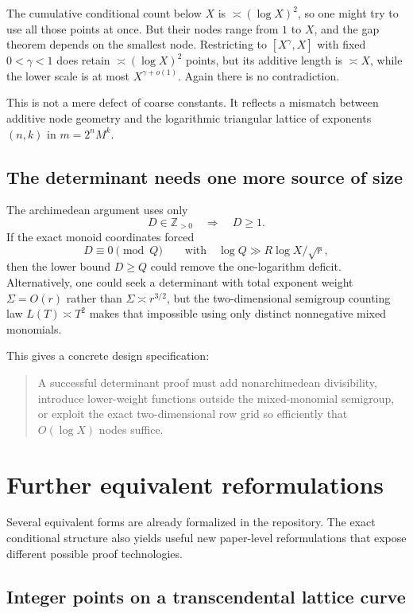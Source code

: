 \documentclass[11pt,oneside]{article}
\theoremstyle{definition}
\theoremstyle{remark}
\newcommand{\Z}{\mathbb Z}
\begin{document}
The cumulative conditional count below $X$ is $\asymp(\log X)^2$, so one might try to use all
those points at once.  But their nodes range from $1$ to $X$, and the gap theorem depends on
the smallest node.  Restricting to $[X^\gamma,X]$ with fixed $0<\gamma<1$ does retain
$\asymp(\log X)^2$ points, but its additive length is $\asymp X$, while the lower scale is at
most $X^{\gamma+o(1)}$.  Again there is no contradiction.

This is not a mere defect of coarse constants.  It reflects a mismatch between additive node
geometry and the logarithmic triangular lattice of exponents $(n,k)$ in
$m=2^nM^k$.

\subsection{The determinant needs one more source of size}

The archimedean argument uses only
\[
 D\in\Z_{>0}\quad\Longrightarrow\quad D\ge1.
\]
If the exact monoid coordinates forced
\[
 D\equiv0\pmod{Q}
\qquad\text{with}\quad
 \log Q\gg R\log X/\sqrt r,
\]
then the lower bound $D\ge Q$ could remove the one-logarithm deficit.  Alternatively, one could
seek a determinant with total exponent weight $\Sigma=O(r)$ rather than
$\Sigma\asymp r^{3/2}$, but the two-dimensional semigroup counting law
$L(T)\asymp T^2$ makes that impossible using only distinct nonnegative mixed monomials.

This gives a concrete design specification:

\begin{quote}
A successful determinant proof must add nonarchimedean divisibility, introduce lower-weight
functions outside the mixed-monomial semigroup, or exploit the exact two-dimensional row grid
so efficiently that $O(\!\log X)$ nodes suffice.
\end{quote}

\section{Further equivalent reformulations}
\label{sec:reformulations}

Several equivalent forms are already formalized in the repository.  The exact conditional
structure also yields useful new paper-level reformulations that expose different possible
proof technologies.

\subsection{Integer points on a transcendental lattice curve}
\end{document}
